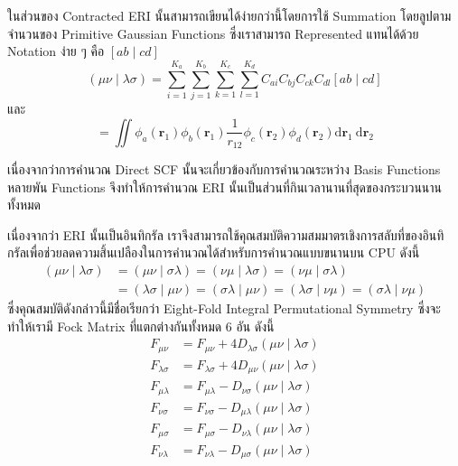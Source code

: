 ในส่วนของ Contracted ERI นั้นสามารถเขียนได้ง่ายกว่านี้โดยการใช้ Summation โดยลูปตามจำนวนของ Primitive Gaussian Functions ซึ่งเราสามารถ Represented แทนได้ด้วย Notation ง่าย ๆ คือ $[a b \mid c d]$
%
\begin{equation}
  (\mu \nu \mid \lambda \sigma)
  =
  \sum_{i=1}^{K_a}
  \sum_{j=1}^{K_b}
  \sum_{k=1}^{K_c}
  \sum_{l=1}^{K_d}
  C_{a i} C_{b j} C_{c k} C_{d l}[a b \mid c d]
\end{equation}
%
และ
%
\begin{equation}
  [a b \mid c d]
  =
  \iint \phi_a\left(\boldsymbol{r}_1\right) \phi_b\left(\boldsymbol{r}_1\right)
  \frac{1}{r_{12}}
  \phi_c\left(\boldsymbol{r}_2\right) \phi_d\left(\boldsymbol{r}_2\right) \mathrm{d} \boldsymbol{r}_1
  \mathrm{~d} \boldsymbol{r}_2
\end{equation}

เนื่องจากว่าการคำนวณ Direct SCF นั้นจะเกี่ยวข้องกับการคำนวณระหว่าง Basis Functions หลายพัน Functions จึงทำให้การคำนวณ ERI นั้นเป็นส่วนที่กินเวลานานที่สุดของกระบวนนานทั้งหมด

เนื่องจากว่า ERI นั้นเป็นอินทิกรัล เราจึงสามารถใช้คุณสมบัติความสมมาตรเชิงการสลับที่ของอินทิกรัลเพื่อช่วยลดความสิ้นเปลืองในการคำนวณได้สำหรับการคำนวณแบบขนานบน CPU ดังนี้
%
\begin{equation}
  \begin{aligned}
    (\mu \nu \mid \lambda \sigma)
     & = (\mu \nu \mid \sigma \lambda)
    = (\nu \mu \mid \lambda \sigma)
    = (\nu \mu \mid \sigma \lambda)    \\
     & = (\lambda \sigma \mid \mu \nu)
    = (\sigma \lambda \mid \mu \nu)
    = (\lambda \sigma \mid \nu \mu)
    = (\sigma \lambda \mid \nu \mu)
  \end{aligned}
\end{equation}
%
ซึ่งคุณสมบัติดังกล่าวนี้มีชื่อเรียกว่า Eight-Fold Integral Permutational Symmetry ซึ่งจะทำให้เรามี Fock Matrix ที่แตกต่างกันทั้งหมด 6 อัน ดังนี้
%
\begin{equation}
  \begin{aligned}
    F_{\mu \nu}        & = F_{\mu \nu}+4 D_{\lambda \sigma}(\mu \nu \mid \lambda \sigma) \\
    F_{\lambda \sigma} & =F_{\lambda \sigma}+4 D_{\mu \nu}(\mu \nu \mid \lambda \sigma)  \\
    F_{\mu \lambda}    & =F_{\mu \lambda}-D_{\nu \sigma}(\mu \nu \mid \lambda \sigma)    \\
    F_{\nu \sigma}     & =F_{\nu \sigma}-D_{\mu \lambda}(\mu \nu \mid \lambda \sigma)    \\
    F_{\mu \sigma}     & =F_{\mu \sigma}-D_{\nu \lambda}(\mu \nu \mid \lambda \sigma)    \\
    F_{\nu \lambda}    & =F_{\nu \lambda}-D_{\mu \sigma}(\mu \nu \mid \lambda \sigma)
  \end{aligned}
\end{equation}

